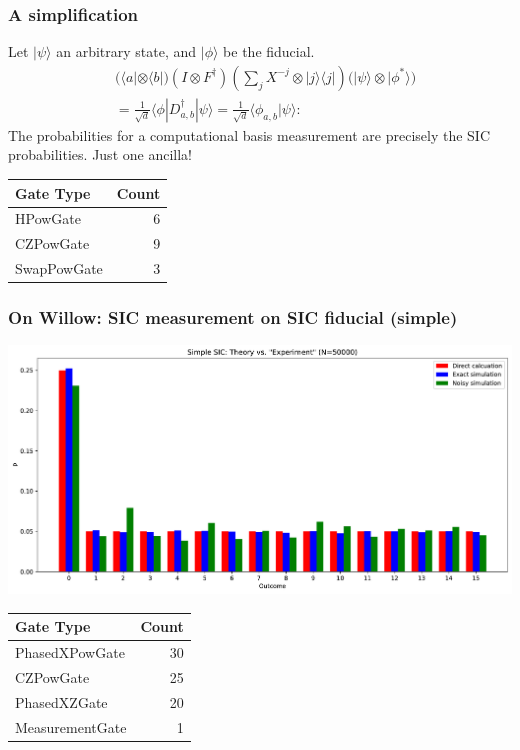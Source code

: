 \documentclass{beamer}
\begin{document}
\begin{frame}
	\frametitle{A simplification}
Let  $|\psi\rangle$ an arbitrary state, and $|\phi\rangle$ be the fiducial.
\begin{align}
&\Big(\langle a| \otimes \langle b|\Big)(I\otimes F^\dagger)\left(\sum_j X^{-j}\otimes |j\rangle\langle j|\right)\Big(|\psi\rangle \otimes |\phi^*\rangle	\Big)\nonumber\\
&=\frac{1}{\sqrt{d}}\langle \phi |D_{a,b}^\dagger |\psi\rangle=\frac{1}{\sqrt{d}}\langle \phi_{a,b}|\psi\rangle:
\end{align}
The probabilities for a computational basis measurement are precisely the SIC probabilities. Just one ancilla!
\begin{table}[h!]
\centering
\begin{tabular}{lr}
\toprule
\textbf{Gate Type} & \textbf{Count} \\
\midrule
HPowGate    & 6 \\
CZPowGate   & 9 \\
SwapPowGate & 3 \\
\bottomrule
\end{tabular}
\label{tab:gate_counts_3}
\end{table}
\end{frame}


\begin{frame}
\frametitle{On Willow: SIC measurement on SIC fiducial (simple)}
\begin{center}
\includegraphics[scale=0.34]{img/simple_theory_vs_experiment}
\end{center}	
\begin{tiny}
\begin{table}[h!]
\centering
\begin{tabular}{lr}
\toprule
\textbf{Gate Type} & \textbf{Count} \\
\midrule
PhasedXPowGate  & 30 \\
CZPowGate       & 25 \\
PhasedXZGate    & 20 \\
MeasurementGate & 1 \\
\bottomrule
\end{tabular}
\label{tab:circuit_gate_counts_2}
\end{table}
\end{tiny}
\end{frame}
\end{document}
